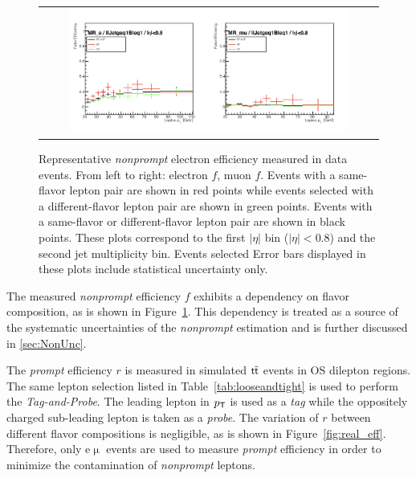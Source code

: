 \begin{figure}[tbh!]
 \begin{center}
 \begin{tabular}{c}
 \includegraphics[width=0.85\textwidth]{figures/Part3/Nonprompt/MR/fake_eff}
 \end{tabular}
 \caption{Representative \emph{nonprompt} electron efficiency measured in data events. From left to right: electron $f$, muon $f$. Events with a same-flavor lepton pair are shown in red points while events selected with a different-flavor lepton pair are shown in green points. Events with a same-flavor or different-flavor lepton pair are shown in black points. These plots correspond to the first $|\eta|$ bin ($|\eta|<$0.8) and the second jet multiplicity bin. Events selected Error bars displayed in these plots include statistical uncertainty only. }
 \label{fig:fake_eff}
 \end{center}
\end{figure}

The measured \emph{nonprompt} efficiency $f$ exhibits a dependency on flavor composition, as is shown in Figure~\ref{fig:fake_eff}. This dependency is treated as a source of the systematic uncertainties of the \emph{nonprompt} estimation and is further discussed in \autoref{sec:NonUnc}.

The \emph{prompt} efficiency $r$ is measured in simulated $\textsf{t}\overline{\textsf{t}}$ events in \ac{OS} dilepton regions. The same lepton selection listed in Table~\ref{tab:looseandtight} is used to perform the \emph{Tag-and-Probe}. The leading lepton in $p_{\textsf{T}}$ is used as a \emph{tag} while the oppositely charged sub-leading lepton is taken as a \emph{probe}. The variation of $r$ between different flavor compositions is negligible, as is shown in Figure~\ref{fig:real_eff}. Therefore, only e$\upmu$ events are used to measure \emph{prompt} efficiency in order to minimize the contamination of \emph{nonprompt} leptons.

